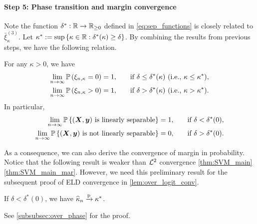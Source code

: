 \paragraph{Step 5: Phase transition and margin convergence}
Note the function $\delta^*: \R \to \R_{\ge 0}$ defined in \cref{eq:sep_functions} is closely related to $\bar\xi_{\kappa}^{(3)}$. Let $\kappa^* := \sup\left\{ \kappa \in \R: \delta^*(\kappa) \ge \delta \right\}$. By combining the results from previous steps, we have the following relation.
\begin{lem} 
\label{lem:over_phase_trans}
For any $\kappa > 0$, we have
\begin{equation*}
    \begin{aligned}
        \lim_{n \rightarrow \infty} \P\left( \xi_{n, \kappa} = 0 \right) = 1, \qquad & \text{if $\delta \le \delta^*(\kappa)$ (i.e., $\kappa \le \kappa^*$)}, \\
        \lim_{n \rightarrow \infty} \P\left( \xi_{n, \kappa} > 0 \right) = 1, \qquad & \text{if $\delta > \delta^*(\kappa)$ (i.e., $\kappa > \kappa^*$)}.
    \end{aligned}
\end{equation*}
In particular,
\begin{equation*}
    \begin{aligned}
        \lim_{n \rightarrow \infty} \P\left\{ \text{$(\XX, \yy)$ is linearly separable} \right\} = 1, \qquad & \text{if $\delta < \delta^*(0)$}, \\
        \lim_{n \rightarrow \infty} \P\left\{ \text{$(\XX, \yy)$ is not linearly separable} \right\} = 0, \qquad & \text{if $\delta > \delta^*(0)$}.
    \end{aligned}
\end{equation*}
\end{lem}
As a consequence, we can also derive the convergence of margin in probability. Notice that the following result is weaker than $\cL^2$ convergence \cref{thm:SVM_main}\ref{thm:SVM_main_mar}. However, we need this preliminary result for the subsequent proof of ELD convergence in \cref{lem:over_logit_conv}.
\begin{lem}
\label{lem:over_mar_conp}
If $\delta < \delta^*(0)$, we have $\hat\kappa_n \conp \kappa^*$.
\end{lem}
\noindent
See \cref{subsubsec:over_phase} for the proof.








